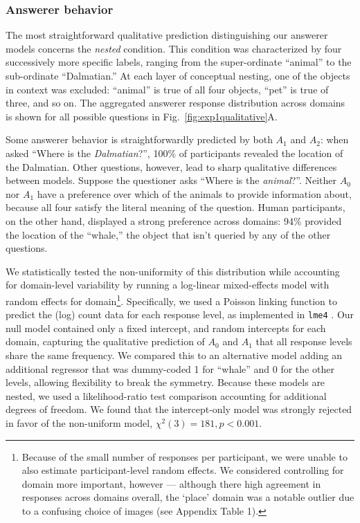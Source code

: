 \documentclass[11pt, floatsintext]{apa6}
\begin{document}
\subsubsection{Answerer behavior}
The most straightforward qualitative prediction distinguishing our answerer models concerns the \emph{nested} condition. 
This condition was characterized by four successively more specific labels, ranging from the super-ordinate ``animal'' to the sub-ordinate ``Dalmatian.'' 
At each layer of conceptual nesting, one of the objects in context was excluded: ``animal'' is true of all four objects, ``pet'' is true of three, and so on.
The aggregated answerer response distribution across domains is shown for all possible questions in Fig.~\ref{fig:exp1qualitative}A.

Some answerer behavior is straightforwardly predicted by both $A_1$ and $A_2$: when asked ``Where is the \emph{Dalmatian}?'', 100\% of participants revealed the location of the Dalmatian.
Other questions, however, lead to sharp qualitative differences between models.
Suppose the questioner asks ``Where is the \emph{animal}?''. 
Neither $A_0$ nor $A_1$ have a preference over which of the animals to provide information about, because all four satisfy the literal meaning of the question. 
Human participants, on the other hand, displayed a strong preference across domains: 94\% provided the location of the ``whale,'' the object that isn't queried by any of the other questions.

We statistically tested the non-uniformity of this distribution while accounting for domain-level variability by running a log-linear mixed-effects model with random effects for domain\footnote{Because of the small number of responses per participant, we were unable to also estimate participant-level random effects. We considered controlling for domain more important, however --- although there high agreement in responses across domains overall, the `place' domain was a notable outlier due to a confusing choice of images (see Appendix Table 1).}. 
Specifically, we used a Poisson linking function to predict the (log) count data for each response level, as implemented in \texttt{lme4} \cite{bates2014fitting}.
Our null model contained only a fixed intercept, and random intercepts for each domain, capturing the qualitative prediction of $A_0$ and $A_1$ that all response levels share the same frequency.
We compared this to an alternative model adding an additional regressor that was dummy-coded 1 for ``whale'' and 0 for the other levels, allowing flexibility to break the symmetry.
Because these models are nested, we used a likelihood-ratio test comparison accounting for additional degrees of freedom. 
We found that the intercept-only model was strongly rejected in favor of the non-uniform model, $\chi^2(3) = 181, p < 0.001$.
\end{document}
